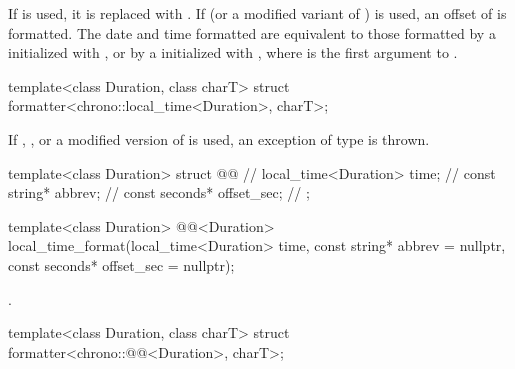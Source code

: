 \begin{itemdescr}
\pnum
\remarks
If  is used,
it is replaced with .
If  (or a modified variant of ) is used,
an offset of  is formatted.
The date and time formatted are equivalent to
those formatted
by a  initialized with , or
by a  initialized with ,
where  is the first argument to .
\end{itemdescr}

%
\begin{itemdecl}
template<class Duration, class charT>
  struct formatter<chrono::local_time<Duration>, charT>;
\end{itemdecl}

\begin{itemdescr}
\pnum
\remarks
If , , or a modified version of  is used,
an exception of type  is thrown.
\end{itemdescr}

%
\begin{codeblock}
template<class Duration> struct @@ {           // \expos
  local_time<Duration> time;                                    // \expos
  const string* abbrev;                                         // \expos
  const seconds* offset_sec;                                    // \expos
};
\end{codeblock}

%
\begin{itemdecl}
template<class Duration>
  @@<Duration>
    local_time_format(local_time<Duration> time, const string* abbrev = nullptr,
                      const seconds* offset_sec = nullptr);
\end{itemdecl}

\begin{itemdescr}
\pnum
\returns
{}.
\end{itemdescr}

%
\begin{itemdecl}
template<class Duration, class charT>
  struct formatter<chrono::@@<Duration>, charT>;
\end{itemdecl}

